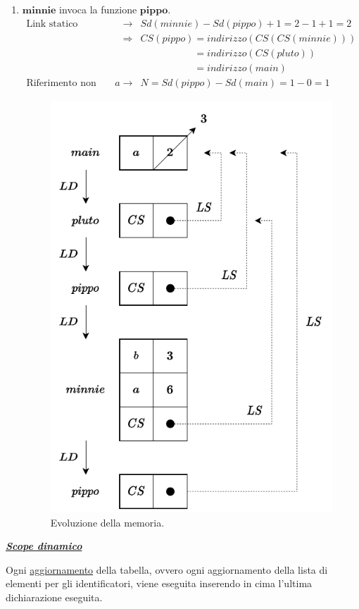 \documentclass[a4paper]{article}
\begin{document}
\begin{enumerate}
		\item $\mathbf{minnie}$ invoca la funzione $\mathbf{pippo}$.
		\begin{equation*}
			\begin{array}{rcl}
				\text{Link statico} &\rightarrow& Sd(minnie) - Sd(pippo) + 1 = 2 - 1 + 1 = 2 \\ [.3em]
				&\Rightarrow& CS(pippo) = indirizzo(CS(CS(minnie))) \\ [.3em]
				&&\phantom{ CS(pippo) } = indirizzo(CS(pluto)) \\ [.3em]
				&&\phantom{ CS(pippo) } = indirizzo(main) \\ [.3em]
				\text{Riferimento non locale }a &\rightarrow& N = Sd(pippo) - Sd(main) = 1-0 = 1
			\end{array}
		\end{equation*}
		\begin{figure}[!htp]
			\centering
			\includegraphics[width=.6\textwidth]{img/ex3-5.pdf}
			\caption*{Evoluzione della memoria.}
		\end{figure}
	\end{enumerate}\newpage
	
	\begin{center}
		\textbf{\emph{\underline{Scope dinamico}}}
	\end{center}
	
	\noindent
	Ogni \underline{aggiornamento} della tabella, ovvero ogni aggiornamento della lista di elementi per gli identificatori, viene eseguita inserendo in cima l'ultima dichiarazione eseguita.\newline
	
\end{document}

